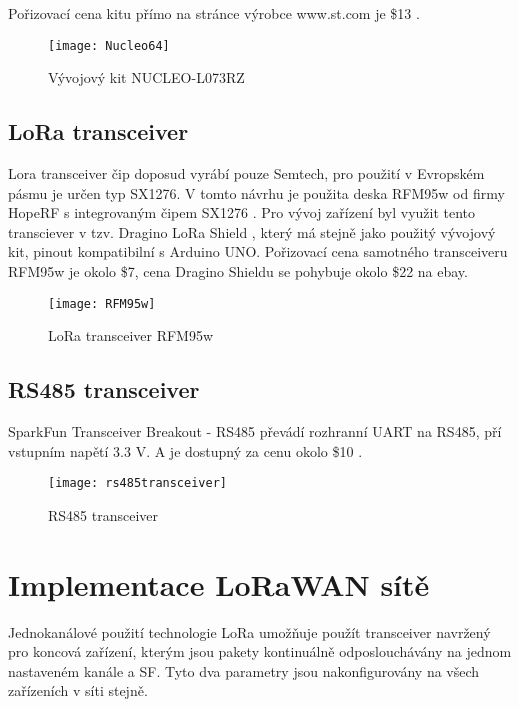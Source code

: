 Pořizovací cena kitu přímo na stránce výrobce www.st.com je \$13 \cite{nucleoST} \cite{nucleoMbed}.
\begin{figure}[!h]
    \centering
    \texttt{[image: Nucleo64]}
    \caption{Vývojový kit NUCLEO-L073RZ \cite{nucleoST}}
    \label{fig:02}
\end{figure}

\subsection{LoRa transceiver}
Lora transceiver čip doposud vyrábí pouze Semtech, pro použití v Evropském pásmu je určen typ SX1276.
V tomto návrhu je použita deska RFM95w od firmy HopeRF s integrovaným čipem SX1276 \cite{RFM95w}.
Pro vývoj zařízení byl využit tento transciever v tzv. Dragino LoRa Shield \cite{draginoWiki}, který má stejně jako použitý vývojový kit, pinout kompatibilní s Arduino UNO. Pořizovací cena samotného transceiveru RFM95w je okolo \$7, cena Dragino Shieldu se pohybuje okolo \$22 na ebay.

\begin{figure}[!h]
    \centering
    \texttt{[image: RFM95w]}
    \caption{LoRa transceiver RFM95w \cite{RFM95w}}
    \label{fig:02}
\end{figure}

\subsection{RS485 transceiver}
SparkFun Transceiver Breakout - RS485 převádí rozhranní UART na RS485, pří vstupním napětí 3.3 V. A je dostupný za cenu okolo \$10 \cite{rs485tr}.

\begin{figure}[!h]
    \centering
    \texttt{[image: rs485transceiver]}
    \caption{RS485 transceiver \cite{rs485tr}}
    \label{fig:rs485transceiver}
\end{figure}

\newpage
\section{Implementace LoRaWAN sítě}
Jednokanálové použití technologie LoRa umožňuje použít transceiver navržený pro koncová zařízení, 
kterým jsou pakety kontinuálně odposlouchávány na jednom nastaveném kanále a SF. 
Tyto dva parametry jsou nakonfigurovány na všech zařízeních v síti stejně.

